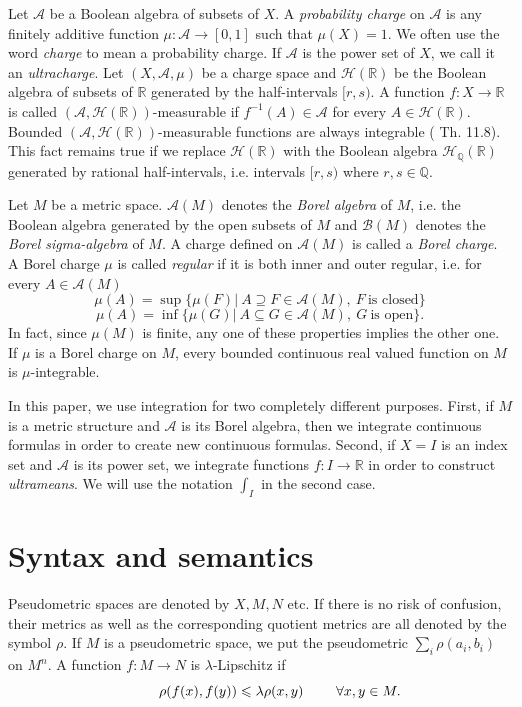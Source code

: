 \documentclass[12pt]{article}
\def\Qn{\mathbb Q}
\def\Rn{\mathbb R}
\begin{document}
Let $\mathcal A$ be a Boolean algebra of subsets of $X$. A \emph{probability charge} on $\mathcal A$
is any finitely additive function $\mu:\mathcal A\rightarrow[0,1]$ such that $\mu(X)=1$.
We often use the word \emph{charge} to mean a probability charge. If $\mathcal A$ is the power set of $X$,
we call it an \emph{ultracharge}.
Let $(X,\mathcal A,\mu)$ be a charge space and $\mathcal H(\Rn)$ be the Boolean algebra of subsets of $\Rn$
generated by the half-intervals $[r,s)$.
A function $f:X\rightarrow\Rn$ is called $(\mathcal A,\mathcal H(\Rn))$-measurable
if $f^{-1}(A)\in\mathcal A$ for every $A\in\mathcal H(\Rn)$.
Bounded $(\mathcal A,\mathcal H(\Rn))$-measurable functions are always integrable (\cite{Aliprantis-Inf} Th. 11.8).
This fact remains true if we replace $\mathcal{H}(\Rn)$ with the Boolean algebra $\mathcal{H}_{\Qn}(\Rn)$
generated by rational half-intervals, i.e. intervals $[r,s)$ where $r,s\in \Qn$.

Let $M$ be a metric space. $\mathcal A(M)$ denotes the \emph{Borel algebra}
of $M$, i.e. the Boolean algebra generated by the open subsets of $M$ and $\mathcal B(M)$ denotes the \emph{Borel sigma-algebra} of $M$.
A charge defined on $\mathcal A(M)$ is called a \emph{Borel charge}.
A Borel charge $\mu$ is called \emph{regular} if it is both inner and outer regular,
i.e. for every $A\in\mathcal{A}(M)$
$$\mu(A)=\sup\{\mu(F)|\ A\supseteq F\in\mathcal A(M),\ F\ \mbox{is\ closed}\}$$
$$\mu(A)=\inf\{\mu(G)|\ A\subseteq G\in\mathcal A(M),\ G\ \mbox{is\ open}\}.$$
In fact, since $\mu(M)$ is finite, any one of these properties implies the other one.
If $\mu$ is a Borel charge on $M$, every bounded continuous real valued function on $M$ is $\mu$-integrable.

In this paper, we use integration for two completely different purposes.
First, if $M$ is a metric structure and $\mathcal A$ is its Borel algebra, then we integrate
continuous formulas in order to create new continuous formulas.
Second, if $X=I$ is an index set and $\mathcal A$ is its power set, we integrate functions
$f:I\rightarrow\Rn$ in order to construct \emph{ultrameans}. We will use the notation $\int_I$ in the second case.


\section{Syntax and semantics}
Pseudometric spaces are denoted by $X, M, N$ etc. If there is no risk of confusion,
their metrics as well as the corresponding quotient metrics are all denoted by the symbol $\rho$.
If $M$ is a pseudometric space, we put the pseudometric
$\sum_i \rho(a_i,b_i)$ on $M^n$. A function $f:M\rightarrow N$ is $\lambda$-Lipschitz if
$$\hspace{10mm} \rho(f(x),f(y))\leqslant\lambda \rho(x,y)\ \ \ \ \ \ \ \forall x,y\in M.$$
\end{document}
